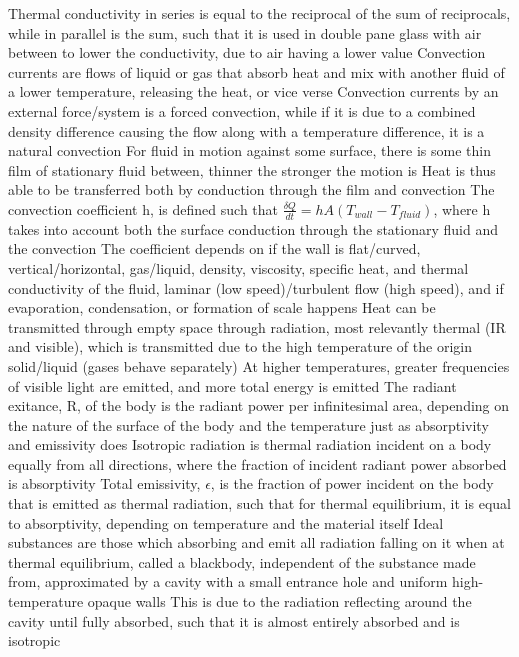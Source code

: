 \documentclass[11 pt, twoside]{article}
\newenvironment{outline*}
{
	\begin{outline}[enumerate]
	}
	{\end{outline}
}
\begin{document}
\begin{outline*}
\2 Thermal conductivity in series is equal to the reciprocal of the sum of reciprocals, while in parallel is the sum, such that it is used in double pane glass with air between to lower the conductivity, due to air having a lower value
\1 Convection currents are flows of liquid or gas that absorb heat and mix with another fluid of a lower temperature, releasing the heat, or vice verse
\2 Convection currents by an external force/system is a forced convection, while if it is due to a combined density difference causing the flow along with a temperature difference, it is a natural convection
\2 For fluid in motion against some surface, there is some thin film of stationary fluid between, thinner the stronger the motion is
\3 Heat is thus able to be transferred both by conduction through the film and convection
\2 The convection coefficient h, is defined such that $\frac{\delta Q}{dt} = hA(T_{wall} - T_{fluid})$, where h takes into account both the surface conduction through the stationary fluid and the convection
\3 The coefficient depends on if the wall is flat/curved, vertical/horizontal, gas/liquid, density, viscosity, specific heat, and thermal conductivity of the fluid, laminar (low speed)/turbulent flow (high speed), and if evaporation, condensation, or formation of scale happens
\1 Heat can be transmitted through empty space through radiation, most relevantly thermal (IR and visible), which is transmitted due to the high temperature of the origin solid/liquid (gases behave separately)
\2 At higher temperatures, greater frequencies of visible light are emitted, and more total energy is emitted
\2 The radiant exitance, R, of the body is the radiant power per infinitesimal area, depending on the nature of the surface of the body and the temperature just as absorptivity and emissivity does
\2 Isotropic radiation is thermal radiation incident on a body equally from all directions, where the fraction of incident radiant power absorbed is absorptivity
\3 Total emissivity, $\epsilon$, is the fraction of power incident on the body that is emitted as thermal radiation, such that for thermal equilibrium, it is equal to absorptivity, depending on temperature and the material itself
\3 Ideal substances are those which absorbing and emit all radiation falling on it when at thermal equilibrium, called a blackbody, independent of the substance made from, approximated by a cavity with a small entrance hole and uniform high-temperature opaque walls
\4 This is due to the radiation reflecting around the cavity until fully absorbed, such that it is almost entirely absorbed and is isotropic

\end{outline*}
\end{document}
